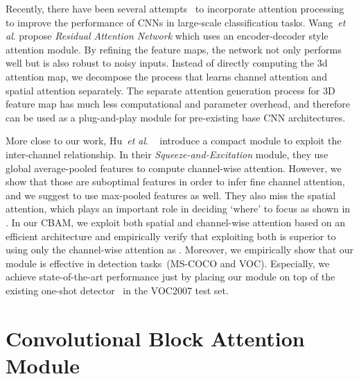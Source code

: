 \documentclass[runningheads]{llncs}
\newcommand{\etal}{\textit{et al}. }
\newcommand*{\modulenamefull}{Convolutional Block Attention Module}
\newcommand*{\modulenameabb}{CBAM}
\begin{document}
Recently, there have been several attempts~\cite{wang2017residual,hu2017squeeze} to incorporate attention processing to improve the performance of CNNs in large-scale classification tasks. Wang~\etal\cite{wang2017residual} propose \textit{Residual Attention Network} which uses an encoder-decoder style attention module. By refining the feature maps, the network not only performs well but is also robust to noisy inputs. Instead of directly computing the 3d attention map, we decompose the process that learns channel attention and spatial attention separately. The separate attention generation process for 3D feature map has much less computational and parameter overhead, and therefore can be used as a plug-and-play module for pre-existing base CNN architectures.

More close to our work, Hu~\etal~\cite{hu2017squeeze} introduce a compact module to exploit the inter-channel relationship. In their \textit{Squeeze-and-Excitation} module, they use global average-pooled features to compute channel-wise attention. However, we show that those are suboptimal features in order to infer fine channel attention, and we suggest to use max-pooled features as well. They also miss the spatial attention, which plays an important role in deciding `where' to focus as shown in \cite{chen2016sca}. In our \modulenameabb, we exploit both spatial and channel-wise attention based on an efficient architecture and empirically verify that exploiting both is superior to using only the channel-wise attention as \cite{hu2017squeeze}.
Moreover, we empirically show that our module is effective in detection tasks~(MS-COCO and VOC). Especially, we achieve state-of-the-art performance just by placing our module on top of the existing one-shot detector~\cite{woo2017stairnet} in the VOC2007 test set.



\section {\modulenamefull}
\end{document}
